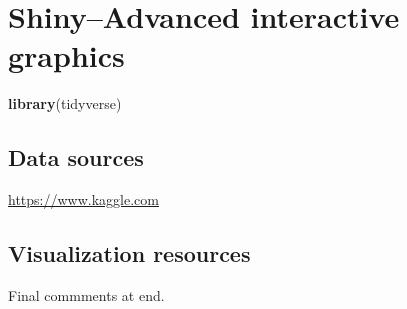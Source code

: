 \documentclass[]{krantz}
\makeatletter
\newenvironment{Shaded}{\begin{snugshade}}{\end{snugshade}}
\newcommand{\KeywordTok}[1]{\textcolor[rgb]{0.13,0.29,0.53}{\textbf{#1}}}
\newcommand{\NormalTok}[1]{#1}
\newenvironment{kframe}{%
\medskip{}
\setlength{\fboxsep}{.8em}
 \def\at@end@of@kframe{}%
 \ifinner\ifhmode%
  \def\at@end@of@kframe{\end{minipage}}%
  \begin{minipage}{\columnwidth}%
 \fi\fi%
 \def\FrameCommand##1{\hskip\@totalleftmargin \hskip-\fboxsep
 \colorbox{shadecolor}{##1}\hskip-\fboxsep
     \hskip-\linewidth \hskip-\@totalleftmargin \hskip\columnwidth}%
 \MakeFramed {\advance\hsize-\width
   \@totalleftmargin\z@ \linewidth\hsize
   \@setminipage}}%
 {\par\unskip\endMakeFramed%
 \at@end@of@kframe}
\renewenvironment{Shaded}{\begin{kframe}}{\end{kframe}}
\theoremstyle{definition}
\theoremstyle{definition}
\theoremstyle{definition}
\theoremstyle{remark}
\makeatother
\begin{document}
\hypertarget{htmlwidget-09ae48de7a79562a757b}{}

\cleardoublepage 

\chapter{Shiny--Advanced interactive
graphics}\label{shinyadvanced-interactive-graphics}

\begin{Shaded}
\begin{Highlighting}[]
\KeywordTok{library}\NormalTok{(tidyverse)}
\end{Highlighting}
\end{Shaded}

\cleardoublepage 

\appendix {}


\section{Data sources}\label{data-sources}

\url{https://www.kaggle.com}

\section{Visualization resources}\label{visualization-resources}

Final commments at end.



\backmatter
\printindex
\end{document}
